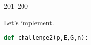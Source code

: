 201~200~\documentclass{article}
\begin{document}
	                                                                        	                                                                    	                                	                    	                    	                        	                        	                    	                                                                	                	                                                                    	                    							                                                                                                                                                                                                    		Let's implement.

	                                                                        	                                                                    	                                	                    	                    	                        	                        	                    	                                                                	                	                                                                    	                    							                                                                                                                                                                                                    		\begin{lstlisting}[language=Python, caption=Cracking the key for Chall 2]
	                                                                        	                                                                    	                                	                    	                    	                        	                        	                    	                                                                	                	                                                                    	                    							                                                                                                                                                                                                    		def challenge2(p,E,G,n):

	                                                                        	                                                                    	                                	                    	                    	                        	                        	                    	                                                                	                	                                                                    	                    							                                                                                                                                                                                                    		    ...


\end{lstlisting}
\end{document}
